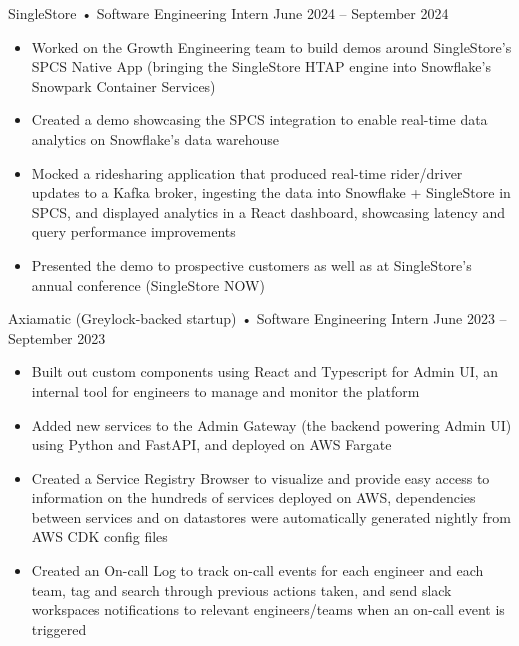 \documentclass[9pt]{developercv} %
\begin{document}
\begin{entrylist}
	\entry
        {}
		{SingleStore • Software Engineering Intern}
		{June 2024 – September 2024}
		{\vspace{-8pt}
        \begin{itemize}[noitemsep,topsep=0pt,parsep=0pt,partopsep=0pt, leftmargin=10pt]
            \item Worked on the Growth Engineering team to build demos around SingleStore's SPCS Native App (bringing the SingleStore HTAP engine into Snowflake's Snowpark Container Services)
            \item Created a demo showcasing the SPCS integration to enable real-time data analytics on Snowflake's data warehouse
            \item Mocked a ridesharing application that produced real-time rider/driver updates to a Kafka broker, ingesting the data into Snowflake + SingleStore in SPCS, and displayed analytics in a React dashboard, showcasing latency and query performance improvements
            \item Presented the demo to prospective customers as well as at SingleStore's annual conference (SingleStore NOW)
        \end{itemize}}
    \entry
        {}
		{Axiamatic (Greylock-backed startup) • Software Engineering Intern}
		{June 2023 – September 2023}
		{\vspace{-8pt}
        \begin{itemize}[noitemsep,topsep=0pt,parsep=0pt,partopsep=0pt, leftmargin=10pt]
            \item Built out custom components using React and Typescript for Admin UI, an internal tool for engineers to manage and monitor the platform
            \item Added new services to the Admin Gateway (the backend powering Admin UI) using Python and FastAPI, and deployed on AWS Fargate
            \item Created a Service Registry Browser to visualize and provide easy access to information on the hundreds of services deployed on AWS, dependencies between services and on datastores were automatically generated nightly from AWS CDK config files
            \item Created an On-call Log to track on-call events for each engineer and each team, tag and search through previous actions taken, and send slack workspaces notifications to relevant engineers/teams when an on-call event is triggered

\end{itemize}}
\end{entrylist}
\end{document}
